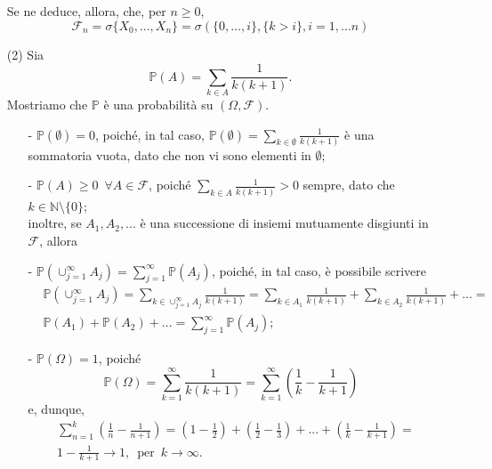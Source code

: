 \documentclass[11pt,largemargins]{homework}
\begin{document}
\begin{enumerate}
  Se ne deduce, allora, che, per $n\geq 0$,
  \begin{equation*}
  \mathcal{F}_{n}=\sigma\{X_{0},...,X_{n}\}=\sigma(\{0, \dots , i\}, \{k > i\}, i = 1, \dots n)
  \end{equation*}
  \item[(2)]
  Sia
  \begin{equation*}
  \mathbb{P}\left(A\right)=\sum_{k\in A}\frac{1}{k\left(k+1\right)}.
  \end{equation*}
  Mostriamo che $\mathbb{P}$ è una probabilità su $\left(\Omega,\mathcal{F}\right)$.
  \begin{itemize}
  \item[-]
  $\mathbb{P}\left(\emptyset\right)=0$, poiché, in tal caso, $\mathbb{P}\left(\emptyset\right)=\sum_{k\in \emptyset}\frac{1}{k\left(k+1\right)}$ è una sommatoria vuota, dato che non vi sono elementi in $\emptyset$;
  \item[-]
  $\mathbb{P}\left(A\right)\geq 0 \,\,\,\forall A\in \mathcal{F}$, poiché $\sum_{k\in A}\frac{1}{k\left(k+1\right)}> 0$ sempre, dato che $k \in \mathbb{N}\setminus\{0\}$;\\
  inoltre, se $A_{1},A_{2},...$ è una successione di insiemi mutuamente disgiunti in $\mathcal{F}$, allora 
  \item[-]
  $\mathbb{P}\left(\cup_{j=1}^{\infty}A_{j}\right)=\sum_{j=1}^{\infty}\mathbb{P}\left(A_{j}\right)$, poiché, in tal caso, è possibile scrivere
  \begin{align*}
  &\mathbb{P}\left(\cup_{j=1}^{\infty}A_{j}\right)=\sum_{k\in\cup_{j=1}^{\infty}A_{j}}\frac{1}{k\left(k+1\right)}=\sum_{k\in A_{1}}\frac{1}{k\left(k+1\right)}+\sum_{k\in A_{2}}\frac{1}{k\left(k+1\right)}+...=\\
  &\mathbb{P}\left(A_{1}\right)+\mathbb{P}\left(A_{2}\right)+...=\sum_{j=1}^{\infty}\mathbb{P}\left(A_{j}\right);
\end{align*}   
\item[-]
$\mathbb{P}\left(\Omega\right)=1$, poiché
\begin{equation*}
\mathbb{P}\left(\Omega\right)=\sum_{k=1}^{\infty}\frac{1}{k\left(k+1\right)}=\sum_{k=1}^{\infty}\left(\frac{1}{k}-\frac{1}{k+1}\right)
\end{equation*}
e, dunque,
\begin{align*}
&\sum_{n=1}^{k}\left(\frac{1}{n}-\frac{1}{n+1}\right)=\left(1-\frac{1}{2}\right)+\left(\frac{1}{2}-\frac{1}{3}\right)+...+\left(\frac{1}{k}-\frac{1}{k+1}\right)=\\
&1-\frac{1}{k+1}\longrightarrow 1, \,\,\, \text{per}\,\,\, k\rightarrow \infty.
\end{align*}
 \end{itemize}
 

\end{enumerate}
\end{document}
